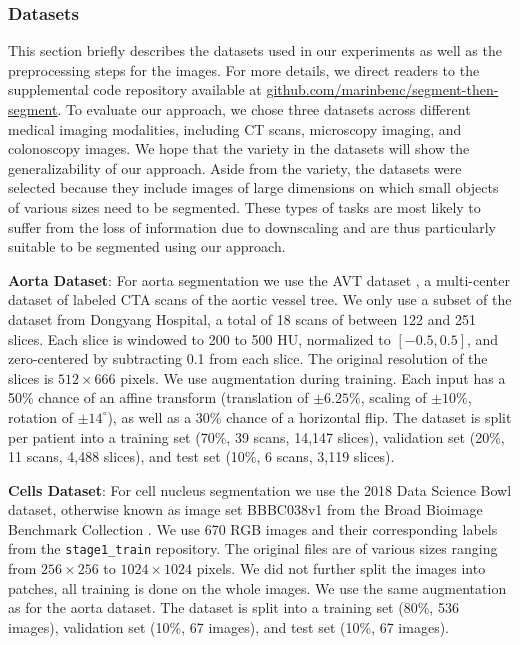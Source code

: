\subsubsection{Datasets}\label{datasets}

This section briefly describes the datasets used in our experiments as well as the preprocessing steps for the images. For more details, we direct readers to the supplemental code repository available at \href{https://github.com/marinbenc/segment-then-segment}{github.com/marinbenc/segment-then-segment}. To evaluate our approach, we chose three datasets across different medical imaging modalities, including CT scans, microscopy imaging, and colonoscopy images. We hope that the variety in the datasets will show the generalizability of our approach. Aside from the variety, the datasets were selected because they include images of large dimensions on which small objects of various sizes need to be segmented. These types of tasks are most likely to suffer from the loss of information due to downscaling and are thus particularly suitable to be segmented using our approach.

\textbf{Aorta Dataset}: For aorta segmentation we use the AVT dataset \cite{radlAVTMulticenterAortic2022}, a multi-center dataset of labeled CTA scans of the aortic vessel tree. We only use a subset of the dataset from Dongyang Hospital, a total of 18 scans of between 122 and 251 slices. Each slice is windowed to 200 to 500 HU, normalized to $[-0.5, 0.5]$, and zero-centered by subtracting 0.1 from each slice. The original resolution of the slices is $512 \times 666$ pixels. We use augmentation during training. Each input has a 50\% chance of an affine transform (translation of $\pm6.25\%$, scaling of $\pm10\%$, rotation of $\pm14^{\circ}$), as well as a 30\% chance of a horizontal flip. The dataset is split per patient into a training set (70\%, 39 scans, 14,147 slices), validation set (20\%, 11 scans, 4,488 slices), and test set (10\%, 6 scans, 3,119 slices).

\textbf{Cells Dataset}: For cell nucleus segmentation we use the 2018 Data Science Bowl dataset, otherwise known as image set BBBC038v1 from the Broad Bioimage Benchmark Collection \cite{caicedoNucleusSegmentationImaging2019}. We use 670 RGB images and their corresponding labels from the \verb|stage1_train| repository. The original files are of various sizes ranging from $256 \times 256$ to $1024 \times 1024$ pixels. We did not further split the images into patches, all training is done on the whole images. We use the same augmentation as for the aorta dataset. The dataset is split into a training set (80\%, 536 images), validation set (10\%, 67 images), and test set (10\%, 67 images).

